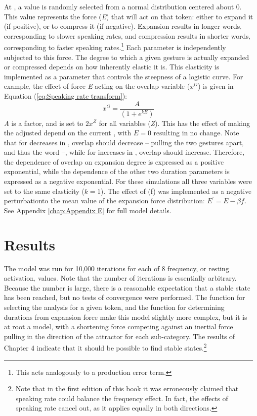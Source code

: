 At , a value is randomly selected from
a normal distribution centered about 0. This value represents the
force (\emph{E}) that will act on that token: either to expand it
(if positive), or to compress it (if negative). Expansion results
in longer words, corresponding to slower speaking rates, and compression
results in shorter words, corresponding to faster speaking rates.\footnote{This acts analogously to a production error term.}
Each  parameter is independently subjected to this force.
The degree to which a given gesture is actually expanded or compressed
depends on how inherently elastic it is. This elasticity is implemented
as a parameter that controls the steepness of a logistic curve. For
example, the effect of force \emph{E} acting on the overlap variable
($x^{O}$) is given in Equation (\ref{eq:Speaking rate transform}): 
\begin{equation}
x^{O}=\frac{A}{(1+e^{kE})}\label{eq:Speaking rate transform}
\end{equation}
\emph{A} is a  factor, and is set to $2x^{Z}$
for all variables (\emph{Z}). This has the effect of making the adjusted
 depend on the current , with $E=0$ resulting in no change.
Note that for decreases in , overlap should decrease
– pulling the two gestures apart, and thus  the word –, while for increases in , overlap should increase. Therefore,
the dependence of overlap on expansion degree is expressed as a positive
exponential, while the dependence of the other two duration parameters
is expressed as a negative exponential. For these simulations all
three  variables were set to the same elasticity ($k=1$).  The effect of  (f) was implemented as a negative perturbationto the mean value of the expansion force distribution: ${E}^{\prime}={E}-{\beta}f$. See Appendix \ref{chap:Appendix E}
for full model details.

\section{Results}

The model was run for 10,000 iterations for each of 8 frequency, or resting activation, values. Note that the number of iterations is essentially
arbitrary. Because the number is large, there is a reasonable
expectation that a stable state has been reached, but no tests of
convergence were performed.  The function for selecting the analysis for a given token, and the function for determining durations from expansion force make this model slightly more complex, but it is at root  a   model, with a shortening force competing against an inertial force pulling in the direction of the attractor for each sub-category. The results of Chapter 4 indicate that it should be possible to find stable states.\footnote{Note that in the first edition of this book it was erroneously claimed that speaking rate could balance the frequency effect. In fact, the effects of speaking rate cancel out, as it applies equally in both directions.}

